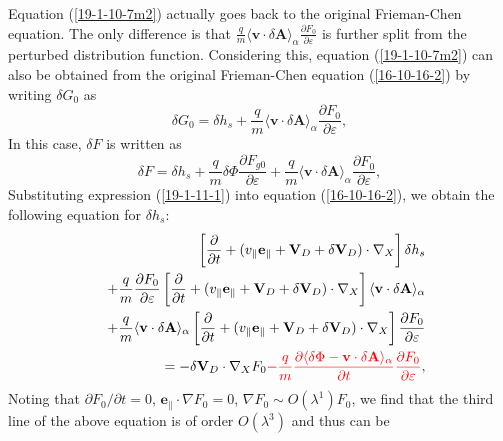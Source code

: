 \documentclass{llncs}
\newcommand{\tmcolor}[2]{{\color{#1}{#2}}}
\begin{document}
Equation (\ref{19-1-10-7m2}) actually goes back to the original Frieman-Chen
equation. The only difference is that $\frac{q}{m} \langle \mathbf{v} \cdot
\delta \mathbf{A} \rangle_{\alpha} \frac{\partial F_0}{\partial \varepsilon}$
is further split from the perturbed distribution function. Considering this,
equation (\ref{19-1-10-7m2}) can also be obtained from the original
Frieman-Chen equation (\ref{16-10-16-2}) by writing $\delta G_0$ as
\begin{equation}
  \label{19-1-11-1} \delta G_0 = \delta h_s + \frac{q}{m} \langle \mathbf{v}
  \cdot \delta \mathbf{A} \rangle_{\alpha} \frac{\partial F_0}{\partial
  \varepsilon},
\end{equation}
In this case, $\delta F$ is written as
\begin{equation}
  \delta F = \delta h_s + \frac{q}{m} \delta \Phi \frac{\partial F_{g
  0}}{\partial \varepsilon} + \frac{q}{m} \langle \mathbf{v} \cdot \delta
  \mathbf{A} \rangle_{\alpha} \frac{\partial F_0}{\partial \varepsilon},
\end{equation}
Substituting expression (\ref{19-1-11-1}) into equation (\ref{16-10-16-2}), we
obtain the following equation for $\delta h_s$:
\begin{eqnarray}
  &  & \left[ \frac{\partial}{\partial t} + (v_{\parallel}
  \mathbf{e}_{\parallel} +\mathbf{V}_D + \delta \mathbf{V}_D) \cdot \nabla_X
  \right] \delta h_s \nonumber\\
  &  & + \frac{q}{m} \frac{\partial F_0}{\partial \varepsilon} \left[
  \frac{\partial}{\partial t} + (v_{\parallel} \mathbf{e}_{\parallel}
  +\mathbf{V}_D + \delta \mathbf{V}_D) \cdot \nabla_X \right] \langle
  \mathbf{v} \cdot \delta \mathbf{A} \rangle_{\alpha} \nonumber\\
  &  & + \frac{q}{m} \langle \mathbf{v} \cdot \delta \mathbf{A}
  \rangle_{\alpha} \left[ \frac{\partial}{\partial t} + (v_{\parallel}
  \mathbf{e}_{\parallel} +\mathbf{V}_D + \delta \mathbf{V}_D) \cdot \nabla_X
  \right] \frac{\partial F_0}{\partial \varepsilon} \nonumber\\
  &  & = - \delta \mathbf{V}_D \cdot \nabla_X F_0 \tmcolor{red}{- \frac{q}{m}
  \frac{\partial \langle \delta \Phi -\mathbf{v} \cdot \delta \mathbf{A}
  \rangle_{\alpha}}{\partial t} \frac{\partial F_0}{\partial \varepsilon}}, 
  \label{19-1-10-e1}
\end{eqnarray}
Noting that $\partial F_0 / \partial t = 0$, $\mathbf{e}_{\parallel} \cdot
\nabla F_0 = 0$, $\nabla F_0 \sim O (\lambda^1) F_0$, we find that the third
line of the above equation is of order $O (\lambda^3)$ and thus can be
\end{document}
